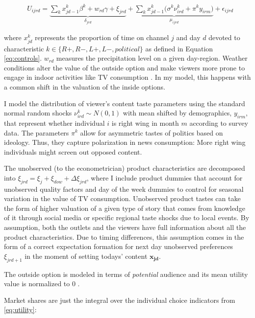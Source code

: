 \documentclass[12pt]{article}
\begin{document}
	
	\begin{equation}\label{eq:utility}
		\begin{aligned}
			& U_{ijrd}= \underbrace{\sum_k x_{jd-1}^k\beta^k+w_{rd}   \gamma  +  \xi_{jrd}}_{\delta_{jrd}}  + \underbrace{  \sum_k x_{jd-1}^k \Big( \sigma^k \nu_{ird}^k  + \pi^ky_{irm} \Big)}_{\mu_{ijrd}}+\epsilon_{ijrd} 
		\end{aligned}
	\end{equation} 
	
	where $ x_{jd}^k $ represents the  proportion of time on channel $ j $ and day $ d$ devoted to characteristic $ k \in \{R+,R-,L+,L-,political\}$ as defined in Equation \ref{eq:controls}. $w_{rd}$ measures the precipitation level on a given day-region. Weather conditions alter the value of the outside option and make viewers more prone to engage in indoor activities like TV consumption \citep{wilbur}. In my model, this happens with a common shift in the valuation of the inside options. 
	
	I model the distribution of viewer's content taste parameters using the standard normal random shocks $ \nu_{ird}^k \sim N(0,1)$ with mean shifted by  demographics, $ y_{irm} $, that represent whether individual $i$ is right wing in month $m$ according to survey data.	The parameters $\pi^k$ allow for asymmetric tastes of politics based on ideology. Thus, they capture polarization in news consumption: More right wing individuals might screen out opposed content. 

The unobserved (to the econometrician) product characteristics are decomposed into $\xi_{jrd}= \xi_j + \xi_{dow} + \Delta \xi_{jrd}$, where I include product dummies that account for unobserved quality factors and day of the week dummies to control for  seasonal variation in the value of TV consumption. Unobserved product tastes can take the form of higher valuation of a given type of story that comes from knowledge of it through social media or specific regional taste shocks due to local events. By assumption, both the outlets and the viewers have full information about all the product characteristics. Due to timing differences, this assumption comes in the form of a correct expectation formation for next day unobserved preferences $ \xi_{jrd+1}$ in the moment of setting todays' content $\bm{x_{jd}}$. 
	
	The outside option is modeled in terms of \textit{potential} audience  \citep{berry1994estimating} and its mean utility value is normalized to 0 .
	
	Market shares are just the integral over the individual choice indicators from \ref{eq:utility}:  
	
\end{document}
